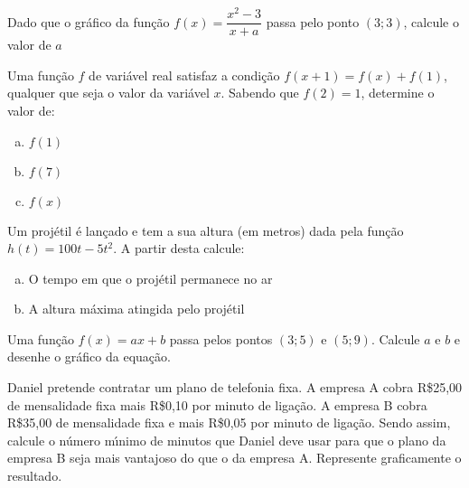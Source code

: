\documentclass[12pt]{article}
\begin{document}
\begin{prob}
Dado que o gr\'{a}fico da fun\c{c}\~{a}o $f\left( x\right) =\dfrac{x^{2}-3}{x+a}$ passa pelo ponto $(3;3)$, calcule o valor de $a$
\end{prob}

\begin{prob}
Uma fun\c{c}\~{a}o $f$ de vari\'{a}vel real satisfaz a condi\c{c}\~{a}o $f\left( x + 1\right) = f\left( x\right) + f\left( 1\right) $, qualquer que seja o valor da vari\'{a}vel $x$. Sabendo que $f\left( 2\right) = 1$, determine o valor de:
\begin{multicols}{3}
\begin{enumerate}[(a)]
\item    $f\left( 1\right)$
\item    $f\left( 7\right)$
\item    $f\left( x\right)$
\end{enumerate}
\end{multicols}
\end{prob}

\begin{prob}
Um proj\'{e}til \'{e} lan\c{c}ado e tem a sua altura (em metros) dada pela fun\c{c}\~{a}o $h\left( t\right) =100t-5t^{2}$. A partir desta calcule:
\begin{multicols}{2}
\begin{enumerate}[(a)]
\item    O tempo em que o proj\'{e}til permanece no ar
\item    A altura m\'{a}xima atingida pelo  proj\'{e}til
\end{enumerate}
\end{multicols}
\end{prob}

\begin{prob}
Uma fun\c{c}\~{a}o $f\left( x\right) =ax+b$ passa pelos pontos $\left( 3;5\right)$ e $\left( 5;9\right) $. Calcule $a$ e $b$ e desenhe o gr\'{a}fico da equa\c{c}\~{a}o.
\end{prob}

\begin{prob}
Daniel pretende contratar um plano de telefonia fixa. A empresa A cobra R\$25,00 de mensalidade fixa mais R\$0,10 por minuto de liga\c{c}\~{a}o. A empresa B cobra R\$35,00 de mensalidade fixa e mais R\$0,05 por minuto de liga\c{c}\~{a}o. Sendo assim, calcule o n\'{u}mero m\'{\i}nimo de minutos que Daniel deve usar para que o plano da empresa B seja mais vantajoso do que o da empresa A. Represente graficamente o resultado.
\end{prob}
\end{document}
